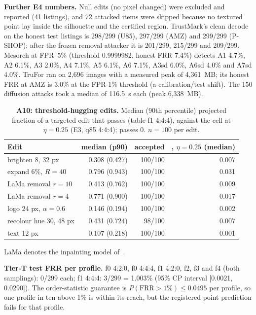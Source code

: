 \documentclass[10pt]{article}
\begin{document}
\textbf{Further E4 numbers.} Null edits (no pixel changed) were excluded and reported (41 listings), and 72 attacked
items were skipped because no textured point lay inside the silhouette and the certified region. TrustMark's clean
decode on the honest test listings is 298/299 (U85), 297/299 (AMZ) and 299/299 (P-SHOP); after the frozen removal
attacker it is 201/299, 215/299 and 209/299. Mesorch at FPR~5\% (threshold 0.9999982, honest FRR 7.4\%) detects A1 4.7\%,
A2 6.1\%, A3 2.0\%, A4 7.1\%, A5 6.1\%, A6 7.1\%, A3sd 6.0\%, A6sd 4.0\% and A7sd 4.0\%. TruFor ran on 2,696 images
with a measured peak of 4,361~MB; its honest FRR at AMZ is 3.0\% at the FPR-1\% threshold (a calibration/test shift). The 150 diffusion attacks took a median of 116.5~s each (peak 6,338~MB).

\begin{table}[!htbp]
\centering\tabsize
\caption{\textbf{A10: threshold-hugging edits.} Median (90th percentile) projected fraction of a targeted edit that passes \tierT{} (table f1 4:4:4),
against the \Eone{} cell at $\eta=0.25$ (E3, q85 4:4:4); \Ezero{} passes 0. $n=100$ per edit.}
\label{tab:a10}
\begin{tabular}{@{}lrrr@{}}
\toprule
Edit & \tierT{} median (p90) & accepted & \Eone{}, $\eta=0.25$ (median) \\
\midrule
brighten 8, 32 px & 0.308 (0.427) & 100/100 & 0.007 \\
expand 6\%, $R=40$ & 0.796 (0.943) & 100/100 & 0.031 \\
LaMa removal $r=10$ & 0.413 (0.762) & 100/100 & 0.009 \\
LaMa removal $r=4$ & 0.771 (0.900) & 100/100 & 0.017 \\
logo 24 px, $\alpha=0.6$ & 0.146 (0.194) & 100/100 & 0.002 \\
recolour hue 30, 48 px & 0.431 (0.724) & 98/100 & 0.007 \\
text 12 px & 0.107 (0.218) & 100/100 & 0.001 \\
\bottomrule
\end{tabular}
\end{table}
LaMa denotes the inpainting model of~\cite{suvorov2022resolutionrobust}.

\textbf{Tier-T test FRR per profile.} f0 4:2:0, f0 4:4:4, f1 4:2:0, f2, f3 and f4 (both samplings): 0/299 each;
f1 4:4:4: 3/299 = 1.003\% (95\% CP interval [0.0021, 0.0290]). The order-statistic guarantee is
$P(\text{FRR}>1\%)\le0.0495$ per profile, so one profile in ten above 1\% is within its reach, but the registered
point prediction fails for that profile.
\end{document}
